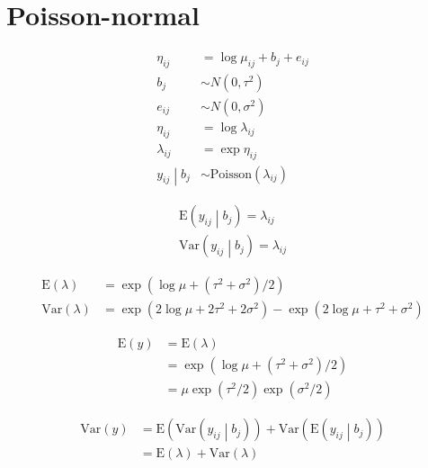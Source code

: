 \documentclass{article}
\begin{document}
\section{Poisson-normal}

\begin{align*}
\eta_{ij} & = \log{\mu_{ij}} + b_j + e_{ij} \\
b_j & \sim N\left(0, \tau^2\right) \\
e_{ij} & \sim N\left(0, \sigma^2\right) \\
\eta_{ij} & = \log{\lambda_{ij}} \\
\lambda_{ij} & = \exp{\eta_{ij}} \\
\left.y_{ij} \middle| b_j\right. & \sim \text{Poisson}\left(\lambda_{ij}\right)
\end{align*}

\begin{align*}
\text{E}\left(y_{ij} \middle| b_j\right) = \lambda_{ij} \\
\text{Var}\left(y_{ij} \middle| b_j\right) = \lambda_{ij}
\end{align*}

\begin{align*}
\text{E}\left(\lambda\right) & = \exp{\left(\log{\mu}+\left(\tau^2+\sigma^2\right) / 2\right)} \\
\text{Var}\left(\lambda\right) & = \exp{\left(2 \log{\mu} + 2\tau^2 + 2\sigma^2\right)} - \exp{\left(2\log{\mu} + \tau^2 +\sigma^2 \right)}
\end{align*}

\begin{align*}
\text{E}\left(y\right) & = \text{E}\left(\lambda\right) \\
& = \exp{\left(\log{\mu}+\left(\tau^2 + \sigma^2\right) / 2\right)} \\
& = \mu \exp{\left(\tau^2 / 2\right)} \exp{\left(\sigma^2 / 2\right)}
\end{align*}

\begin{align*}
\text{Var}\left(y\right) & = \text{E}\left(\text{Var}\left(y_{ij} \middle| b_j\right)\right) +
  \text{Var}\left(\text{E}\left(y_{ij} \middle| b_j\right)\right) \\
& = \text{E}\left(\lambda\right) +
  \text{Var}\left(\lambda\right)
\end{align*}

\end{document}

